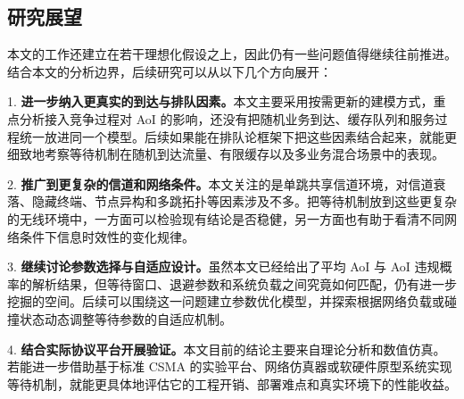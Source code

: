 \subsection{研究展望}

本文的工作还建立在若干理想化假设之上，因此仍有一些问题值得继续往前推进。结合本文的分析边界，后续研究可以从以下几个方向展开：

1. \textbf{进一步纳入更真实的到达与排队因素。}本文主要采用按需更新的建模方式，重点分析接入竞争过程对 AoI 的影响，还没有把随机业务到达、缓存队列和服务过程统一放进同一个模型。后续如果能在排队论框架下把这些因素结合起来，就能更细致地考察等待机制在随机到达流量、有限缓存以及多业务混合场景中的表现。

2. \textbf{推广到更复杂的信道和网络条件。}本文关注的是单跳共享信道环境，对信道衰落、隐藏终端、节点异构和多跳拓扑等因素涉及不多。把等待机制放到这些更复杂的无线环境中，一方面可以检验现有结论是否稳健，另一方面也有助于看清不同网络条件下信息时效性的变化规律。

3. \textbf{继续讨论参数选择与自适应设计。}虽然本文已经给出了平均 AoI 与 AoI 违规概率的解析结果，但等待窗口、退避参数和系统负载之间究竟如何匹配，仍有进一步挖掘的空间。后续可以围绕这一问题建立参数优化模型，并探索根据网络负载或碰撞状态动态调整等待参数的自适应机制。

4. \textbf{结合实际协议平台开展验证。}本文目前的结论主要来自理论分析和数值仿真。若能进一步借助基于标准 CSMA 的实验平台、网络仿真器或软硬件原型系统实现等待机制，就能更具体地评估它的工程开销、部署难点和真实环境下的性能收益。
